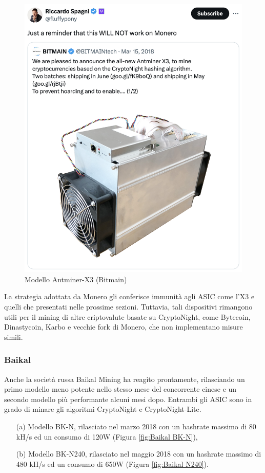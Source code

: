 \begin{figure}[h!]
    \centering
    \includegraphics[width=0.45\linewidth]{images/Antminer-X3.png}
    \caption{Modello Antminer-X3 (Bitmain)}
    \label{fig:Antminer-X3}
\end{figure}

La strategia adottata da Monero gli conferisce immunità agli ASIC come l'X3 e quelli che presentati nelle prossime sezioni. 
Tuttavia, tali dispositivi rimangono utili per il mining di altre criptovalute basate su CryptoNight, come Bytecoin, Dinastycoin, Karbo e vecchie fork di Monero, che non implementano misure simili.


\subsubsection{Baikal}
Anche la società russa Baikal Mining ha reagito prontamente, rilasciando un primo modello meno potente nello stesso mese del concorrente cinese e un secondo modello più performante alcuni mesi dopo.
Entrambi gli ASIC sono in grado di minare gli algoritmi CryptoNight e CryptoNight-Lite.

\begin{itemize}
    \item[(a)] Modello BK-N, rilasciato nel marzo 2018 con un hashrate massimo di 80 kH/s ed un consumo di 120W (Figura \ref{fig:Baikal BK-N}),
    \item[(b)] Modello BK-N240, rilasciato nel maggio 2018 con un hashrate massimo di 480 kH/s ed un consumo di 650W (Figura \ref{fig:Baikal N240}).
\end{itemize}


